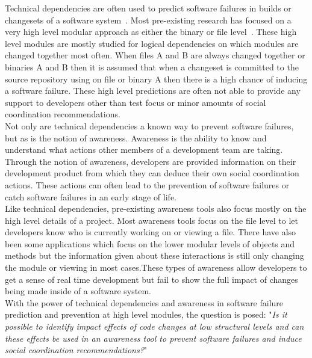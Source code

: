 \documentclass[conference]{IEEEtran}
\begin{document}
Technical dependencies are often used to predict software failures in builds or changesets of
a software system~\cite{Pinzger:2008:DNP, Zimmermann:2008:PDU}. Most pre-existing research
has focused on a very high level modular approach as either the binary or file level~\cite{Kim:2006:AIB}. 
These high level
modules are mostly studied for logical dependencies on which modules are changed together most
often. When files A and B are always changed together or binaries A and B then it is assumed that
when a changeset is committed to the source repository using on file or binary A then there is
a high chance of inducing a software failure. These high level predictions are often not able to
provide any support to developers other than test focus or minor amounts of social
coordination recommendations.\\

Not only are technical dependencies a known way to prevent software failures, but as is the 
notion of awareness. Awareness is the ability to know and understand what actions
other members of a development team are taking. Through the notion of awareness, developers
are provided information on their development product from which they can deduce their
own social coordination actions. These actions can often lead to the prevention of software
failures or catch software failures in an early stage of life. \\

Like technical dependencies, pre-existing awareness tools also focus mostly on the high level
details of a project. Most awareness tools focus on the file level to let developers know who
is currently working on or viewing a file. There have also been some applications which focus
on the lower modular levels of objects and methods but the information given about these
interactions is still only changing the module or viewing in most cases.These types of awareness
allow developers to get a sense of real time development but fail to show the full impact
of changes being made inside of a software system.\\

With the power of technical dependencies and awareness in software failure prediction and
prevention at high level modules, the question is posed:
"\textit{Is it possible to identify impact effects of code changes at low structural levels and can
these effects be used in an awareness tool to prevent software failures and induce social
coordination recommendations?}"\\
\end{document}
